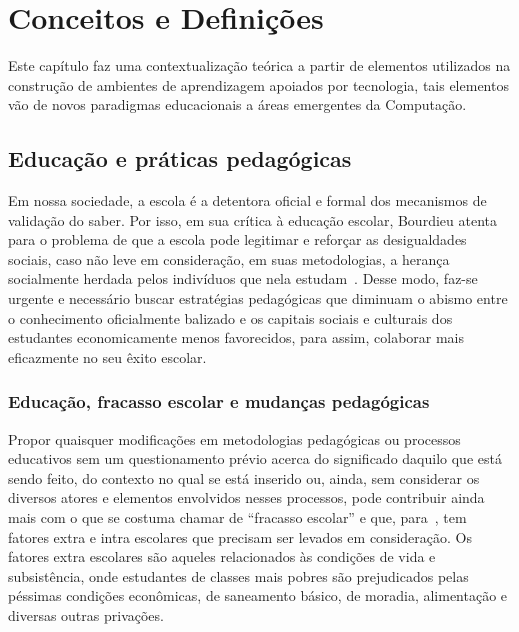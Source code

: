 \chapter{Conceitos e Definições}
\label{Chap:background}

Este capítulo faz uma contextualização teórica a partir de elementos utilizados na construção de ambientes de aprendizagem apoiados por tecnologia, tais elementos vão de novos paradigmas educacionais a áreas emergentes da Computação.

\section{Educação e práticas pedagógicas}\label{section:educacao_praticas}
Em nossa sociedade, a escola é a detentora oficial e formal dos mecanismos de validação do saber. Por isso, em sua crítica à educação escolar, Bourdieu atenta para o problema de que a escola pode legitimar e reforçar as desigualdades sociais, caso não leve em consideração, em suas metodologias, a herança socialmente herdada pelos indivíduos que nela estudam~\citep{Nogueira:2013}. Desse modo, faz-se urgente e necessário buscar estratégias pedagógicas que diminuam o abismo entre o conhecimento oficialmente balizado e os capitais sociais e culturais dos estudantes economicamente menos favorecidos, para assim, colaborar mais eficazmente no seu êxito escolar.
 
\subsection{Educação, fracasso escolar e mudanças pedagógicas}\label{section:educacao_fracasso_mudancas}

Propor quaisquer modificações em metodologias pedagógicas ou processos educativos sem um questionamento prévio acerca do significado daquilo que está sendo feito, do contexto no qual se está inserido ou, ainda, sem considerar os diversos atores e elementos envolvidos nesses processos, pode contribuir ainda mais com o que se costuma chamar de ``fracasso escolar'' e que, para~\cite{Collares:1989}, tem fatores extra e intra escolares que precisam ser levados em consideração. Os fatores extra escolares são aqueles relacionados às condições de vida e subsistência, onde estudantes de classes mais pobres são prejudicados pelas péssimas condições econômicas, de saneamento básico, de moradia, alimentação e diversas outras privações.

